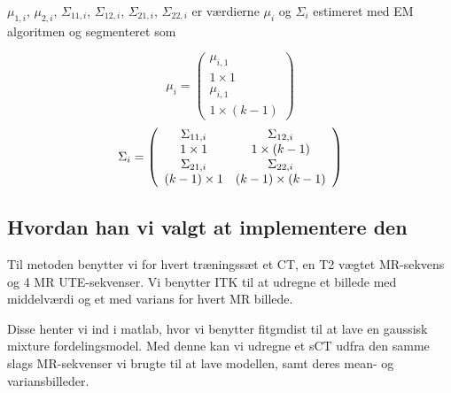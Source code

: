 $\mu_{1,i}$, $\mu_{2,i}$, $\Sigma_{1 1, i}$, $\Sigma_{1 2, i}$, $\Sigma_{2 1, i}$, $\Sigma_{2 2, i}$ er værdierne $\mu_i$ og $\Sigma_i$ estimeret med EM algoritmen og segmenteret som

\begin{equation}
\mu_i = \left(\begin{array}{c}
\mu_{i,1} \\ 1 \times 1 \\
\mu_{i,1} \\ 1 \times (k - 1)  
\end{array}\right)
\end{equation} 
\begin{equation}
\Sigma_i = \left(\begin{array}{c c}
\Sigma_{11,i} & \Sigma_{12,i} \\ 1 \times 1  & 1 \times (k-1)\\
\Sigma_{21,i} & \Sigma_{22,i} \\ (k-1) \times 1  & (k-1) \times (k-1)\\  
\end{array}\right)
\end{equation}

\subsection{Hvordan han vi valgt at implementere den}

Til metoden benytter vi for hvert træningssæt et CT, en T2 vægtet MR-sekvens
og 4 MR UTE-sekvenser. Vi benytter ITK til at udregne et
billede med middelværdi og et med varians for hvert MR billede.

Disse henter vi ind i matlab, hvor vi benytter fitgmdist til at lave en
gaussisk mixture fordelingsmodel. Med denne kan vi udregne et sCT udfra den
samme slags MR-sekvenser vi brugte til at lave modellen, samt deres
mean- og variansbilleder.


